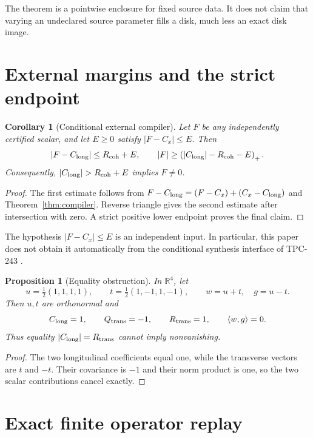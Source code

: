 \documentclass[10pt]{article}
\newtheorem{corollary}[theorem]{Corollary}
\newtheorem{proposition}[theorem]{Proposition}
\newcommand{\ip}[2]{\langle #1,#2\rangle}
\newcommand{\pos}[1]{\left(#1\right)_{+}}
\begin{document}
The theorem is a pointwise enclosure for fixed source data.  It does not
claim that varying an undeclared source parameter fills a disk, much less an
exact disk image.

\section{External margins and the strict endpoint}

\begin{corollary}[Conditional external compiler]\label{cor:external}
Let $F$ be any independently certified scalar, and let $E\ge0$ satisfy
$|F-C_x|\le E$.  Then
\begin{equation}\label{eq:external}
 |F-C_{\rm long}|\le R_{\rm coh}+E,\qquad
 |F|\ge\pos{|C_{\rm long}|-R_{\rm coh}-E}.
\end{equation}
Consequently, $|C_{\rm long}|>R_{\rm coh}+E$ implies $F\ne0$.
\end{corollary}

\begin{proof}
The first estimate follows from
$F-C_{\rm long}=(F-C_x)+(C_x-C_{\rm long})$ and
Theorem~\ref{thm:compiler}.  Reverse triangle gives the second estimate after
intersection with zero.  A strict positive lower endpoint proves the final
claim.
\end{proof}

The hypothesis $|F-C_x|\le E$ is an independent input.  In particular, this
paper does not obtain it automatically from the conditional synthesis
interface of TPC-243 \cite{tpc243}.

\begin{proposition}[Equality obstruction]\label{prop:equality}
In $\mathbb R^4$, let
\[
 u=\tfrac12(1,1,1,1),\qquad
 t=\tfrac12(1,-1,1,-1),\qquad w=u+t,\quad g=u-t.
\]
Then $u,t$ are orthonormal and
\[
 C_{\rm long}=1,\qquad Q_{\rm trans}=-1,\qquad
 R_{\rm trans}=1,\qquad \ip{w}{g}=0.
\]
Thus equality $|C_{\rm long}|=R_{\rm trans}$ cannot imply nonvanishing.
\end{proposition}

\begin{proof}
The two longitudinal coefficients equal one, while the transverse vectors are
$t$ and $-t$.  Their covariance is $-1$ and their norm product is one, so the
two scalar contributions cancel exactly.
\end{proof}

\section{Exact finite operator replay}
\end{document}
